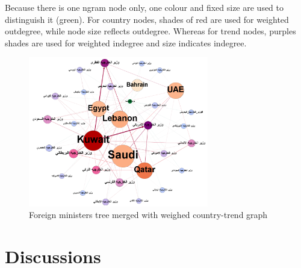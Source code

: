 \documentclass[utf8]{frontiersSCNS} %
\begin{document}
{Because there is one ngram node only, one colour and fixed size are used to distinguish it (green). For country nodes, shades of red are used for weighted outdegree, while node size reflects outdegree. Whereas for trend nodes, purples shades are used for weighted indegree and size indicates indegree.

\begin{figure}[htb] \centering
\includegraphics[width=0.7\textwidth]{images/ctn_graph.png}
\caption{Foreign ministers tree merged with weighed country-trend graph}
\label{fig:ctn_graph}
\end{figure}

\section{Discussions}\label{discussion}

}
\end{document}

